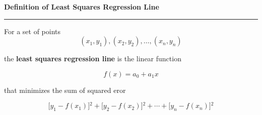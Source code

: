 \nopagenumbers
{\bf Definition of Least Squares Regression Line}
\vskip 1mm
\hrule

\vskip 6pt
For a set of points
$$(x_1,y_1),(x_2,y_2),\ldots,(x_n,y_n)$$

the {\bf least squares regression line} is the linear function

$$f(x)=a_0+a_1x$$

that minimizes the sum of squared eror

$$\bigl\lbrack y_1-f(x_1)\bigr\rbrack{}^2+\bigl\lbrack y_2-f(x_2)\bigr\rbrack{}^2+\cdots+\bigl\lbrack y_n-f(x_n)\bigr\rbrack{}^2$$


\vfill\eject
\bye
